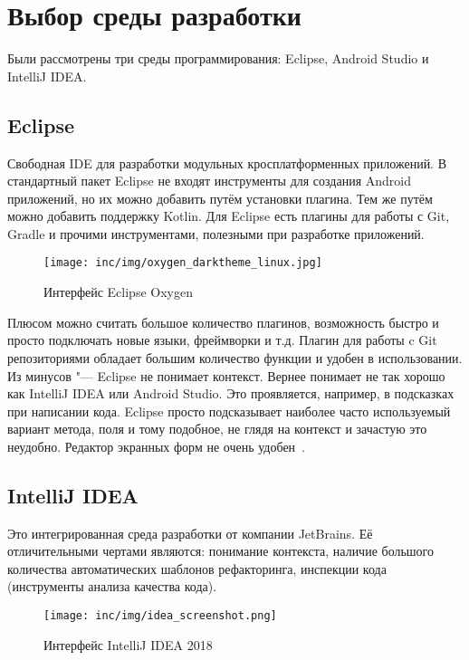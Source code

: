\section{Выбор среды разработки}
\label{sec:ide}
Были рассмотрены три среды программирования: Eclipse, Android Studio и IntelliJ IDEA\@.

\subsection{Eclipse}
\label{subsec:eclipse}
Свободная IDE для разработки модульных кросплатформенных приложений.
В стандартный пакет Eclipse не входят инструменты для создания Android приложений, но их можно добавить путём установки плагина.
Тем же путём можно добавить поддержку Kotlin.
Для Eclipse есть плагины для работы с Git, Gradle и прочими инструментами, полезными при разработке приложений.

\begin{figure}[ht]
  \centering
  \texttt{[image: inc/img/oxygen\_darktheme\_linux.jpg]}
  \caption{Интерфейс Eclipse Oxygen}
  \label{fig:eclipse}
\end{figure}

Плюсом можно считать большое количество плагинов, возможность быстро и просто подключать новые языки, фреймворки и т.д.
Плагин для работы c Git репозиториями обладает большим количество функции и удобен в использовании.
Из минусов "--- Eclipse не понимает контекст.
Вернее понимает не так хорошо как IntelliJ IDEA или Android Studio.
Это проявляется, например, в подсказках при написании кода.
Eclipse просто подсказывает наиболее часто используемый вариант метода, поля и тому подобное, не глядя на контекст и зачастую это неудобно.
Редактор экранных форм не очень удобен~\cite{eclipse:oxygen}.

\subsection{IntelliJ IDEA}
\label{subsec:idea}
Это интегрированная среда разработки от компании JetBrains.
Её отличительными чертами являются: понимание контекста, наличие большого количества автоматических шаблонов рефакторинга, инспекции кода (инструменты анализа качества кода).

\begin{figure}[ht]
  \centering
  \texttt{[image: inc/img/idea\_screenshot.png]}
  \caption{Интерфейс IntelliJ IDEA 2018}
  \label{fig:idea}
\end{figure}


